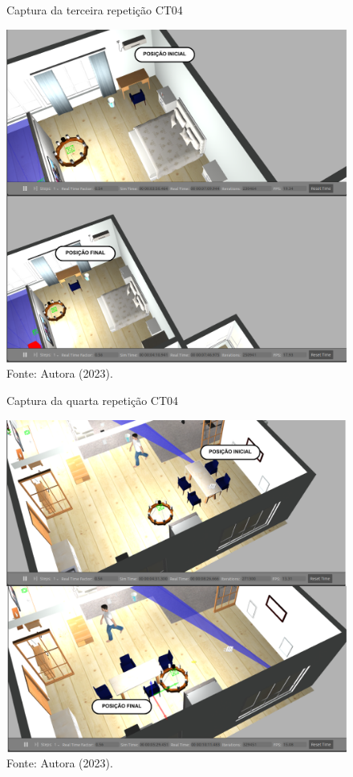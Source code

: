 \begin{figure}[H]
    \centering
    \caption{Captura da terceira repetição CT04}
    \includegraphics[scale=0.5]{ct05_3.png}
    \caption*{Fonte: Autora (2023).}
    \label{fig:ct05_3}
\end{figure}

\begin{figure}[H]
    \centering
    \caption{Captura da quarta repetição CT04}
    \includegraphics[scale=0.5]{ct05_4.png}
    \caption*{Fonte: Autora (2023).}
    \label{fig:ct05_4}
\end{figure}


